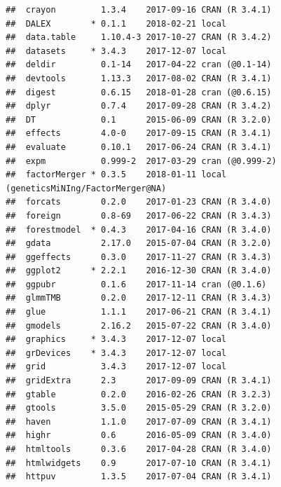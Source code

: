 \documentclass[]{book}
\theoremstyle{definition}
\theoremstyle{definition}
\theoremstyle{definition}
\theoremstyle{remark}
\begin{document}
\begin{verbatim}
##  crayon         1.3.4    2017-09-16 CRAN (R 3.4.1)                        
##  DALEX        * 0.1.1    2018-02-21 local                                 
##  data.table     1.10.4-3 2017-10-27 CRAN (R 3.4.2)                        
##  datasets     * 3.4.3    2017-12-07 local                                 
##  deldir         0.1-14   2017-04-22 cran (@0.1-14)                        
##  devtools       1.13.3   2017-08-02 CRAN (R 3.4.1)                        
##  digest         0.6.15   2018-01-28 cran (@0.6.15)                        
##  dplyr          0.7.4    2017-09-28 CRAN (R 3.4.2)                        
##  DT             0.1      2015-06-09 CRAN (R 3.2.0)                        
##  effects        4.0-0    2017-09-15 CRAN (R 3.4.1)                        
##  evaluate       0.10.1   2017-06-24 CRAN (R 3.4.1)                        
##  expm           0.999-2  2017-03-29 cran (@0.999-2)                       
##  factorMerger * 0.3.5    2018-01-11 local (geneticsMiNIng/FactorMerger@NA)
##  forcats        0.2.0    2017-01-23 CRAN (R 3.4.0)                        
##  foreign        0.8-69   2017-06-22 CRAN (R 3.4.3)                        
##  forestmodel  * 0.4.3    2017-04-16 CRAN (R 3.4.0)                        
##  gdata          2.17.0   2015-07-04 CRAN (R 3.2.0)                        
##  ggeffects      0.3.0    2017-11-27 CRAN (R 3.4.3)                        
##  ggplot2      * 2.2.1    2016-12-30 CRAN (R 3.4.0)                        
##  ggpubr         0.1.6    2017-11-14 cran (@0.1.6)                         
##  glmmTMB        0.2.0    2017-12-11 CRAN (R 3.4.3)                        
##  glue           1.1.1    2017-06-21 CRAN (R 3.4.1)                        
##  gmodels        2.16.2   2015-07-22 CRAN (R 3.4.0)                        
##  graphics     * 3.4.3    2017-12-07 local                                 
##  grDevices    * 3.4.3    2017-12-07 local                                 
##  grid           3.4.3    2017-12-07 local                                 
##  gridExtra      2.3      2017-09-09 CRAN (R 3.4.1)                        
##  gtable         0.2.0    2016-02-26 CRAN (R 3.2.3)                        
##  gtools         3.5.0    2015-05-29 CRAN (R 3.2.0)                        
##  haven          1.1.0    2017-07-09 CRAN (R 3.4.1)                        
##  highr          0.6      2016-05-09 CRAN (R 3.4.0)                        
##  htmltools      0.3.6    2017-04-28 CRAN (R 3.4.0)                        
##  htmlwidgets    0.9      2017-07-10 CRAN (R 3.4.1)                        
##  httpuv         1.3.5    2017-07-04 CRAN (R 3.4.1)                        

\end{verbatim}
\end{document}

